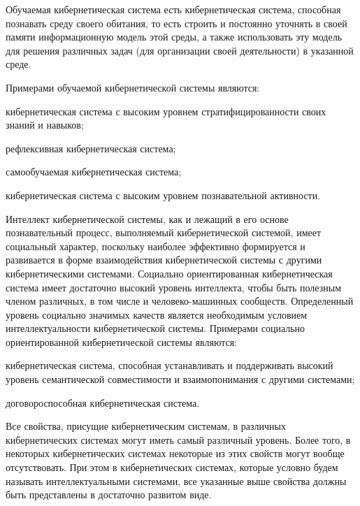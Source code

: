 Обучаемая кибернетическая система есть кибернетическая система, способная познавать среду своего обитания, то есть строить и постоянно уточнять в своей памяти информационную модель этой среды, а также использовать эту модель для решения различных задач (для организации своей деятельности) в указанной среде. 

Примерами обучаемой кибернетической системы являются:
\begin{textitemize}
    \item кибернетическая система с высоким уровнем стратифицированности своих знаний и навыков;
    \item рефлексивная кибернетическая система;
    \item самообучаемая кибернетическая система;
    \item кибернетическая система с высоким уровнем познавательной активности.
\end{textitemize}

Интеллект кибернетической системы, как и лежащий в его основе познавательный процесс, выполняемый кибернетической системой, имеет социальный характер, поскольку наиболее эффективно формируется и развивается в форме взаимодействия кибернетической системы с другими кибернетическими системами.
Социально ориентированная кибернетическая система имеет достаточно высокий уровень интеллекта, чтобы быть полезным членом различных, в том числе и человеко-машинных сообществ.
Определенный уровень социально значимых качеств является необходимым условием интеллектуальности кибернетической системы.
Примерами социально ориентированной кибернетической системы являются:
\begin{textitemize}
    \item кибернетическая система, способная устанавливать и поддерживать высокий уровень семантической совместимости и взаимопонимания с другими системами;
    \item договороспособная кибернетическая система.
\end{textitemize}

Все свойства, присущие кибернетическим системам, в различных кибернетических системах могут иметь самый различный уровень.
Более того, в некоторых кибернетических системах некоторые из этих свойств могут вообще отсутствовать.
При этом в кибернетических системах, которые условно будем называть интеллектуальными системами, все указанные выше свойства должны быть представлены в достаточно развитом виде.